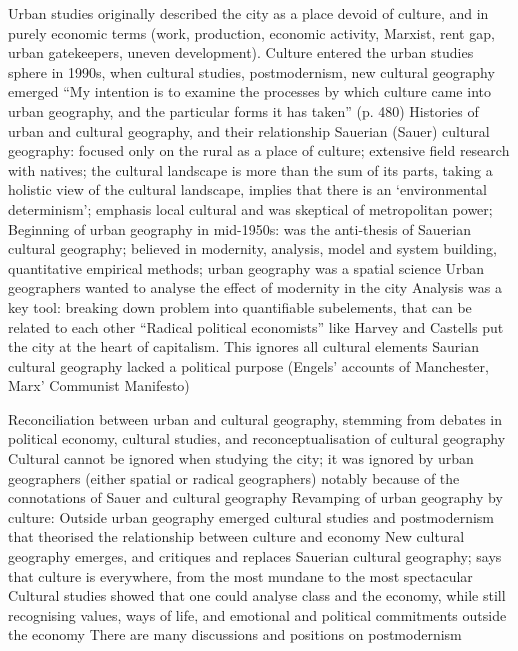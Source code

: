 \documentclass{article}
\begin{document}
\begin{outline}
	\1 Urban studies originally described the city as a place devoid of culture, and in purely economic terms (work, production, economic activity, Marxist, rent gap, urban gatekeepers, uneven development). Culture entered the urban studies sphere in 1990s, when cultural studies, postmodernism, new cultural geography emerged
	\1 ``My intention is to examine the processes by which culture came into urban geography, and the particular forms it has taken'' (p. 480)
	\1 Histories of urban and cultural geography, and their relationship
		\2 Sauerian (Sauer) cultural geography: focused only on the rural as a place of culture; extensive field research with natives; the cultural landscape is more than the sum of its parts, taking a holistic view of the cultural landscape, implies that there is an `environmental determinism'; emphasis local cultural and was skeptical of metropolitan power;
		\2 Beginning of urban geography in mid-1950s: was the anti-thesis of Sauerian cultural geography; believed in modernity, analysis, model and system building, quantitative empirical methods; urban geography was a spatial science
			\3 Urban geographers wanted to analyse the effect of modernity in the city
			\3 Analysis was a key tool: breaking down problem into quantifiable subelements, that can be related to each other
			\3 ``Radical political economists'' like Harvey and Castells put the city at the heart of capitalism. This ignores all cultural elements
			\3 Saurian cultural geography lacked a political purpose (Engels' accounts of Manchester, Marx' Communist Manifesto)
	
	\1 Reconciliation between urban and cultural geography, stemming from debates in political economy, cultural studies, and reconceptualisation of cultural geography
		\2 Cultural cannot be ignored when studying the city; it was ignored by urban geographers (either spatial or radical geographers) notably because of the connotations of Sauer and cultural geography
		\2 Revamping of urban geography by culture:
			\3 Outside urban geography emerged cultural studies and postmodernism that theorised the relationship between culture and economy
			\3 New cultural geography emerges, and critiques and replaces Sauerian cultural geography; says that culture is everywhere, from the most mundane to the most spectacular
		\2 Cultural studies showed that one could analyse class and the economy, while still recognising values, ways of life, and emotional and political commitments outside the economy
		\2 There are many discussions and positions on postmodernism
		

\end{outline}
\end{document}
